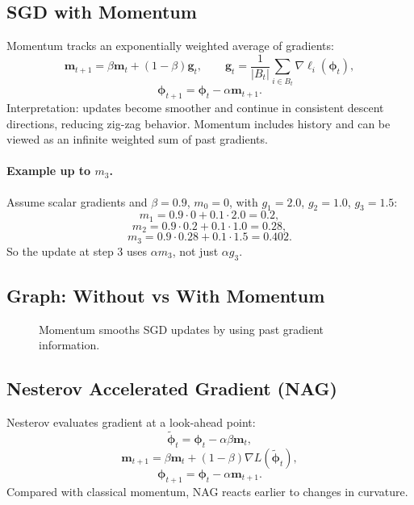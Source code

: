 \subsection{SGD with Momentum}
Momentum tracks an exponentially weighted average of gradients:
\[
\mathbf{m}_{t+1}=\beta\mathbf{m}_t+(1-\beta)\mathbf{g}_t,
\qquad
\mathbf{g}_t=\frac{1}{|B_t|}\sum_{i\in B_t}\nabla\ell_i(\boldsymbol{\phi}_t),
\]
\[
\boldsymbol{\phi}_{t+1}=\boldsymbol{\phi}_t-\alpha\mathbf{m}_{t+1}.
\]
Interpretation: updates become smoother and continue in consistent descent
directions, reducing zig-zag behavior. Momentum includes history and can be viewed
as an infinite weighted sum of past gradients.

\paragraph{Example up to \texorpdfstring{$m_3$}{m3}.}
Assume scalar gradients and $\beta=0.9$, $m_0=0$, with
$g_1=2.0$, $g_2=1.0$, $g_3=1.5$:
\[
m_1=0.9\cdot 0+0.1\cdot 2.0=0.2,
\]
\[
m_2=0.9\cdot 0.2+0.1\cdot 1.0=0.28,
\]
\[
m_3=0.9\cdot 0.28+0.1\cdot 1.5=0.402.
\]
So the update at step 3 uses $\alpha m_3$, not just $\alpha g_3$.

\subsection{Graph: Without vs With Momentum}
\begin{figure}[h!]
\centering
{}
\caption{Momentum smooths SGD updates by using past gradient information.}
\end{figure}

\subsection{Nesterov Accelerated Gradient (NAG)}
Nesterov evaluates gradient at a look-ahead point:
\[
\tilde{\boldsymbol{\phi}}_t=\boldsymbol{\phi}_t-\alpha\beta\mathbf{m}_t,
\]
\[
\mathbf{m}_{t+1}=\beta\mathbf{m}_t+(1-\beta)\nabla L(\tilde{\boldsymbol{\phi}}_t),
\]
\[
\boldsymbol{\phi}_{t+1}=\boldsymbol{\phi}_t-\alpha\mathbf{m}_{t+1}.
\]
Compared with classical momentum, NAG reacts earlier to changes in curvature.

